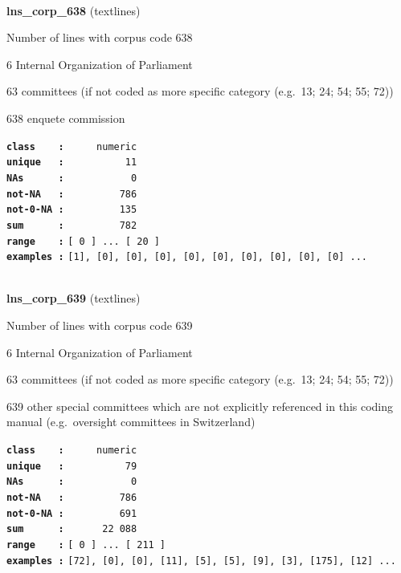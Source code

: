 \documentclass[]{article}
\begin{document}
~

\textbf{lns\_corp\_638} (textlines)

Number of lines with corpus code 638

6 Internal Organization of Parliament

63 committees (if not coded as more specific category (e.g.~13; 24; 54;
55; 72))

638 enquete commission

\textbf{\texttt{class\ \ \ \ :}} \texttt{~~~~~numeric}\\
\textbf{\texttt{unique\ \ \ :}} \texttt{~~~~~~~~~~11}\\
\textbf{\texttt{NAs\ \ \ \ \ \ :}} \texttt{~~~~~~~~~~~0}\\
\textbf{\texttt{not-NA\ \ \ :}} \texttt{~~~~~~~~~786}\\
\textbf{\texttt{not-0-NA\ :}} \texttt{~~~~~~~~~135}\\
\textbf{\texttt{sum\ \ \ \ \ \ :}} \texttt{~~~~~~~~~782}\\
\textbf{\texttt{range\ \ \ \ :}}
\texttt{{[}\ 0\ {]}\ ...\ {[}\ 20\ {]}}\\
\textbf{\texttt{examples\ :}}
\texttt{{[}1{]},\ {[}0{]},\ {[}0{]},\ {[}0{]},\ {[}0{]},\ {[}0{]},\ {[}0{]},\ {[}0{]},\ {[}0{]},\ {[}0{]}\ ...}\\

~

\textbf{lns\_corp\_639} (textlines)

Number of lines with corpus code 639

6 Internal Organization of Parliament

63 committees (if not coded as more specific category (e.g.~13; 24; 54;
55; 72))

639 other special committees which are not explicitly referenced in this
coding manual (e.g.~oversight committees in Switzerland)

\textbf{\texttt{class\ \ \ \ :}} \texttt{~~~~~numeric}\\
\textbf{\texttt{unique\ \ \ :}} \texttt{~~~~~~~~~~79}\\
\textbf{\texttt{NAs\ \ \ \ \ \ :}} \texttt{~~~~~~~~~~~0}\\
\textbf{\texttt{not-NA\ \ \ :}} \texttt{~~~~~~~~~786}\\
\textbf{\texttt{not-0-NA\ :}} \texttt{~~~~~~~~~691}\\
\textbf{\texttt{sum\ \ \ \ \ \ :}} \texttt{~~~~~~22~088}\\
\textbf{\texttt{range\ \ \ \ :}}
\texttt{{[}\ 0\ {]}\ ...\ {[}\ 211\ {]}}\\
\textbf{\texttt{examples\ :}}
\texttt{{[}72{]},\ {[}0{]},\ {[}0{]},\ {[}11{]},\ {[}5{]},\ {[}5{]},\ {[}9{]},\ {[}3{]},\ {[}175{]},\ {[}12{]}\ ...}\\
\end{document}
